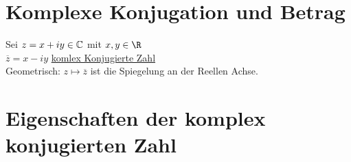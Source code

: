 \section{Komplexe Konjugation und Betrag}
Sei $z = x + iy \in \text{$\mathbb{C}$}$ mit $x, y \in \R$\\
$\overline{z} = x - iy$ \ul{komlex Konjugierte Zahl}\\
Geometrisch: $z \mapsto \overline{z}$ ist die Spiegelung an der Reellen Achse.
\section{Eigenschaften der komplex konjugierten Zahl}
